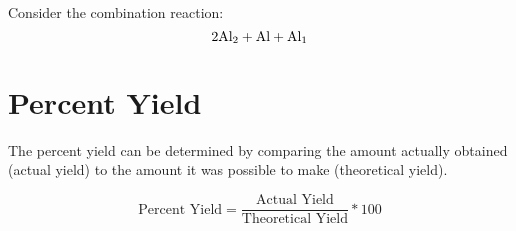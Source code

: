 \documentclass{chem122notes}
\begin{document}
Consider the combination reaction:
\[ 2\chemical{Al}[2] + \chemical{Al} + \chemical{Al}[1] \]

\section{Percent Yield}\label{sec:percent-yield}
The percent yield can be determined by comparing the amount actually obtained (actual yield) to the amount it was possible to make (theoretical yield).

\begin{equation}
	\mbox{Percent Yield} = \frac{\mbox{Actual Yield}}{\mbox{Theoretical Yield}} * 100
	\label{eq:percent-yield}
\end{equation}
\end{document}
